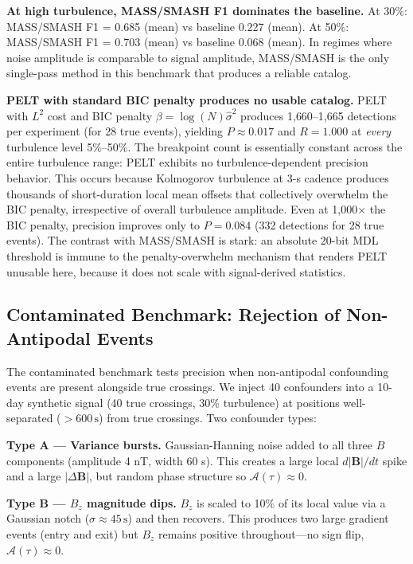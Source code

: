 \documentclass[12pt,letterpaper]{article}
\newcommand{\dBvec}{\Delta\mathbf{B}}
\newcommand{\secunit}{\,\mathrm{s}}
\begin{document}
\textbf{At high turbulence, MASS/SMASH F1 dominates the baseline.}
At 30\%: MASS/SMASH F1 = 0.685 (mean) vs baseline 0.227 (mean).
At 50\%: MASS/SMASH F1 = 0.703 (mean) vs baseline 0.068 (mean).
In regimes where noise amplitude is comparable to signal amplitude,
MASS/SMASH is the only single-pass method in this benchmark that produces
a reliable catalog.

\textbf{PELT with standard BIC penalty produces no usable catalog.}
PELT \citep{Killick2012} with $L^2$ cost and BIC penalty
$\beta = \log(N)\hat{\sigma}^2$ produces 1{,}660--1{,}665 detections per
experiment (for 28 true events), yielding $P \approx 0.017$ and $R = 1.000$
at \emph{every} turbulence level 5\%--50\%.
The breakpoint count is essentially constant across the entire turbulence
range: PELT exhibits no turbulence-dependent precision behavior.
This occurs because Kolmogorov turbulence at 3-s cadence produces thousands
of short-duration local mean offsets that collectively overwhelm the BIC
penalty, irrespective of overall turbulence amplitude.
Even at 1{,}000$\times$ the BIC penalty, precision improves only to
$P = 0.084$ (332 detections for 28 true events).
The contrast with MASS/SMASH is stark: an absolute 20-bit MDL threshold
is immune to the penalty-overwhelm mechanism that renders PELT unusable
here, because it does not scale with signal-derived statistics.

\subsection{Contaminated Benchmark: Rejection of Non-Antipodal Events}
\label{subsec:contaminated}

The contaminated benchmark tests precision when non-antipodal confounding
events are present alongside true crossings.
We inject 40 confounders into a 10-day synthetic signal (40 true crossings,
30\% turbulence) at positions well-separated ($> 600\secunit$) from true
crossings.
Two confounder types:

\textbf{Type A --- Variance bursts.}
Gaussian-Hanning noise added to all three $B$ components (amplitude 4 nT,
width 60 s).
This creates a large local $d|\mathbf{B}|/dt$ spike and a large $|\dBvec|$,
but random phase structure so $\mathcal{A}(\tau) \approx 0$.

\textbf{Type B --- $B_z$ magnitude dips.}
$B_z$ is scaled to 10\% of its local value via a Gaussian notch
($\sigma \approx 45\secunit$) and then recovers.
This produces two large gradient events (entry and exit) but $B_z$ remains
positive throughout---no sign flip, $\mathcal{A}(\tau) \approx 0$.
\end{document}
